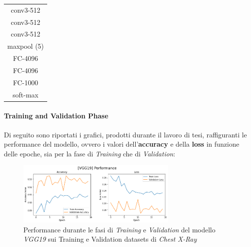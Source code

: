 \begin{table} [!h]
\begin{tabular}{|c|}
                    conv3-512\\
                    conv3-512\\
                    conv3-512\\
                    \hline 
                    \rule[-3mm]{0mm}{8mm}
                    maxpool (5)\\
                    \hline 
                    \rule[-3mm]{0mm}{8mm}
                    FC-4096\\
                    \hline 
                    \rule[-3mm]{0mm}{8mm}
                    FC-4096\\
                    \hline 
                    \rule[-3mm]{0mm}{8mm}
                    FC-1000\\
                    \hline 
                    \rule[-3mm]{0mm}{8mm}
                    soft-max\\
                    \hline 
                \end{tabular}
            \end{table}
        \newpage
        
        \paragraph{Training and Validation Phase} 
        Di seguito sono riportati i grafici, prodotti durante il lavoro di tesi, raffiguranti le performance del modello, ovvero i valori dell'\textbf{accuracy} e della \textbf{loss} in funzione delle epoche, sia per la fase di \textit{Training} che di \textit{Validation}:
            \begin{figure}[!h]
                \centering
                \includegraphics[width=0.7\textwidth]{Images/Modelli/VGG19/VGG19 Pneumonia Performance.png}
                \caption{Performance durante le fasi di \textit{Training} e \textit{Validation} del modello \textit{VGG19} sui Training e Validation datasets di \textit{Chest X-Ray}}
                \label{VGG19 Pneumonia Performance}
            \end{figure}
            

